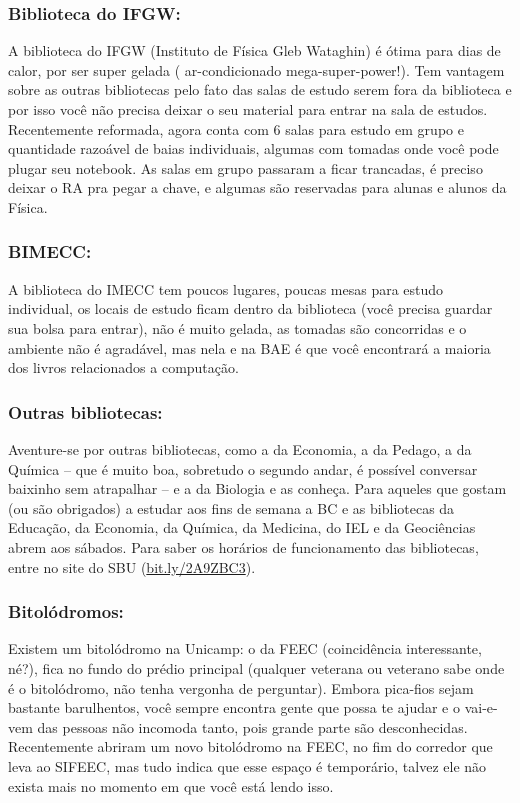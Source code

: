 \subsubsection{Biblioteca do IFGW:} A biblioteca do IFGW (Instituto de Física
Gleb Wataghin) é ótima para dias de calor, por ser super gelada (
ar-condicionado mega-super-power!). Tem vantagem sobre as outras bibliotecas
pelo fato das salas de estudo serem fora da biblioteca e por isso você não
precisa deixar o seu material para entrar na sala de estudos. Recentemente
reformada, agora conta com 6 salas para estudo em grupo e quantidade razoável
de baias individuais, algumas com tomadas onde você pode plugar seu notebook.
As salas em grupo passaram a ficar trancadas, é preciso deixar o RA pra pegar a
chave, e algumas são reservadas para alunas e alunos da Física.

\subsubsection{BIMECC:} A biblioteca do IMECC tem poucos lugares, poucas mesas
para estudo individual, os locais de estudo ficam dentro da biblioteca (você
precisa guardar sua bolsa para entrar), não é muito gelada, as tomadas são
concorridas e o ambiente não é agradável, mas nela e na BAE é que você
encontrará a maioria dos livros relacionados a computação.

\subsubsection{Outras bibliotecas:} Aventure-se por outras bibliotecas, como a
da Economia, a da Pedago, a da Química -- que é muito boa, sobretudo o segundo
andar, é possível conversar baixinho sem atrapalhar -- e a da Biologia e as
conheça. Para aqueles que gostam (ou são obrigados) a estudar aos fins de
semana a BC e as bibliotecas da Educação, da Economia, da Química, da Medicina,
do IEL e da Geociências abrem aos sábados. Para saber os horários de
funcionamento das bibliotecas, entre no site do SBU
(\url{bit.ly/2A9ZBC3}).

\subsubsection{Bitolódromos:} Existem um bitolódromo na Unicamp: o da FEEC
(coincidência interessante, né?), fica no fundo do prédio principal (qualquer
veterana ou veterano sabe onde é o bitolódromo, não tenha vergonha de
perguntar). Embora pica-fios sejam bastante barulhentos, você sempre encontra
gente que possa te ajudar e o vai-e-vem das pessoas não incomoda tanto, pois
grande parte são desconhecidas. Recentemente abriram um novo bitolódromo na
FEEC, no fim do corredor que leva ao SIFEEC, mas tudo indica que esse espaço é
temporário, talvez ele não exista mais no momento em que você está lendo isso.

